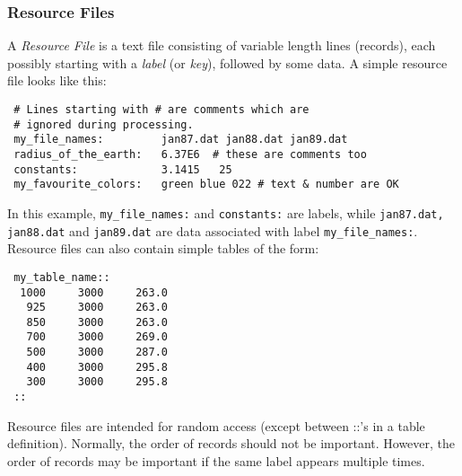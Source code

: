 
 \subsubsection{Resource Files}

      A {\em Resource File} is a text file consisting of variable
     length lines (records), each possibly starting with a {\em label}
     (or {\em key}), followed by some data. A simple resource file 
     looks like this:

 \begin{verbatim}
 # Lines starting with # are comments which are
 # ignored during processing.
 my_file_names:         jan87.dat jan88.dat jan89.dat
 radius_of_the_earth:   6.37E6  # these are comments too
 constants:             3.1415   25
 my_favourite_colors:   green blue 022 # text & number are OK
 \end{verbatim}

    In this example, {\tt my\_file\_names:} and {\tt constants:}
    are labels, while {\tt jan87.dat, jan88.dat} and {\tt jan89.dat} are
    data associated with label {\tt my\_file\_names:}.
    Resource files can also contain simple tables of the form:

 \begin{verbatim}
 my_table_name::
  1000     3000     263.0   
   925     3000     263.0
   850     3000     263.0
   700     3000     269.0
   500     3000     287.0
   400     3000     295.8
   300     3000     295.8    
 ::
 \end{verbatim}

 Resource files are intended for random access (except between ::'s in a 
 table definition). Normally, the order of records should not be important. 
 However, the order of records may be important if the same label appears 
 multiple times.




